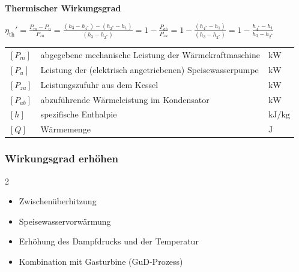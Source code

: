     \textbf{Thermischer Wirkungsgrad}

    $\boxed{\eta_{\mathrm{th}}' 
    = \frac{P_m - P_u}{P_{zu}}
    = \frac{(h_3 - h_{4^*}) - (h_{2^*} - h_1)}{(h_3 - h_{2^*})}
    = 1 - \frac{P_{ab}}{P_{zu}}
    = 1 - \frac{(h_{4^*} - h_1)}{(h_3 - h_{2^*})}
    = 1 - \frac{h_{4^*} - h_1}{h_3 - h_{2^*}}}$

    \begin{tabular}{@{} l p{7.5cm} l @{}}
    $[P_m]$ & abgegebene mechanische Leistung der Wärmekraftmaschine \dotfill & $\mathrm{kW}$    \\
    $[P_{u}]$ & Leistung der (elektrisch angetriebenen) Speisewasserpumpe \dotfill & $\mathrm{kW}$    \\
    $[P_{zu}]$ & Leistungszufuhr aus dem Kessel \dotfill & $\mathrm{kW}$    \\
    $[P_{ab}]$ & abzuführende Wärmeleistung im Kondensator \dotfill & $\mathrm{kW}$    \\
    $[h]$ & spezifische Enthalpie \dotfill & $\mathrm{kJ/kg}$ \\
    $[Q]$ & Wärmemenge \dotfill & $\mathrm{J}$ \\
    \end{tabular}

\subsubsection{Wirkungsgrad erhöhen}
    \vspace{-4mm}
    \def\columnseprulecolor{\color{white}}
    \begin{multicols}{2}
        \begin{itemize}  
            \item Zwischenüberhitzung
            \item Speisewasservorwärmung
            \item Erhöhung des Dampfdrucks und der Temperatur
            \item Kombination mit Gasturbine (GuD-Prozess)
        \end{itemize}
    \end{multicols}
    \def\columnseprulecolor{\color{black}}

